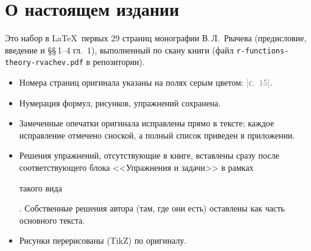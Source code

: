 \section*{О настоящем издании}
Это набор в \LaTeX\ первых 29 страниц монографии В.\,Л.~Рвачева
(предисловие, введение и \S\S\,1--4 гл.~1), выполненный по скану
книги (файл \texttt{r-functions-theory-rvachev.pdf} в репозитории).

\begin{itemize}[nosep]
\item Номера страниц оригинала указаны на полях серым цветом: \textcolor{gray}{[с.~15]}.
\item Нумерация формул, рисунков, упражнений сохранена.
\item Замеченные опечатки оригинала исправлены прямо в тексте; каждое
  исправление отмечено сноской, а полный список приведен в приложении.
\item Решения упражнений, отсутствующие в книге, вставлены сразу после
  соответствующего блока <<Упражнения и задачи>> в рамках
  \begin{tcolorbox}[colback=solcol!4,colframe=solcol!60,boxrule=0.5pt,arc=1pt,
    left=3pt,right=3pt,top=1pt,bottom=1pt,width=5.3cm,nobeforeafter,box align=center]
  \small такого вида\end{tcolorbox}.
  Собственные решения автора (там, где они есть) оставлены как часть основного текста.
\item Рисунки перерисованы (TikZ) по оригиналу.
\end{itemize}
\clearpage
